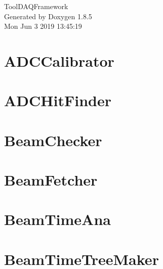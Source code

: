 \documentclass[twoside]{book}
\newcommand{\clearemptydoublepage}{%
  \newpage{\pagestyle{empty}\cleardoublepage}%
}
\begin{document}
\hypersetup{pageanchor=false}
\begin{titlepage}
\vspace*{7cm}
\begin{center}%
{\Large Tool\-D\-A\-Q\-Framework }\\
\vspace*{1cm}
{\large Generated by Doxygen 1.8.5}\\
\vspace*{0.5cm}
{\small Mon Jun 3 2019 13:45:19}\\
\end{center}
\end{titlepage}
\clearemptydoublepage
\tableofcontents
\clearemptydoublepage
{}
\hypersetup{pageanchor=true}

\chapter{A\-D\-C\-Calibrator}
\label{md_UserTools_ADCCalibrator_README}
\hypertarget{md_UserTools_ADCCalibrator_README}{}

\chapter{A\-D\-C\-Hit\-Finder}
\label{md_UserTools_ADCHitFinder_README}
\hypertarget{md_UserTools_ADCHitFinder_README}{}

\chapter{Beam\-Checker}
\label{md_UserTools_BeamChecker_README}
\hypertarget{md_UserTools_BeamChecker_README}{}

\chapter{Beam\-Fetcher}
\label{md_UserTools_BeamFetcher_README}
\hypertarget{md_UserTools_BeamFetcher_README}{}

\chapter{Beam\-Time\-Ana}
\label{md_UserTools_BeamTimeAna_README}
\hypertarget{md_UserTools_BeamTimeAna_README}{}

\chapter{Beam\-Time\-Tree\-Maker}
\label{md_UserTools_BeamTimeTreeMaker_README}
\hypertarget{md_UserTools_BeamTimeTreeMaker_README}{}

\end{document}
